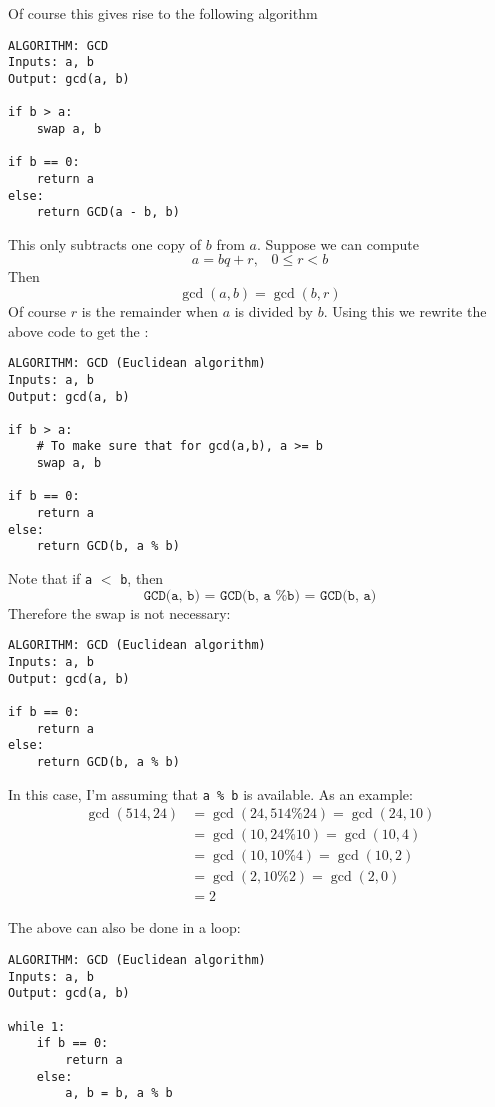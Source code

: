 Of course this gives rise to the following algorithm
\begin{Verbatim}[frame=single,fontsize=\footnotesize]
ALGORITHM: GCD
Inputs: a, b
Output: gcd(a, b)

if b > a:
    swap a, b

if b == 0:
    return a
else:
    return GCD(a - b, b) 
\end{Verbatim}

This only subtracts one copy of $b$ from $a$.
Suppose we can compute
\[
a = bq + r, \,\,\,\,\, 0 \leq r < b
\]
Then
\[
\gcd(a, b) = \gcd(b, r) 
\]
Of course $r$ is the remainder when $a$ is divided by $b$.
Using this we rewrite the above code to get
the
:
\begin{Verbatim}[frame=single,fontsize=\footnotesize]
ALGORITHM: GCD (Euclidean algorithm)
Inputs: a, b
Output: gcd(a, b)

if b > a:
    # To make sure that for gcd(a,b), a >= b
    swap a, b

if b == 0: 
    return a
else:
    return GCD(b, a % b)
\end{Verbatim}
Note that if \verb!a! $<$ \verb!b!, then
\[
\texttt{GCD(a, b) = GCD(b, a \% b) = GCD(b, a)}
\]
Therefore the swap is not necessary:
\begin{Verbatim}[frame=single,fontsize=\footnotesize]
ALGORITHM: GCD (Euclidean algorithm)
Inputs: a, b
Output: gcd(a, b)

if b == 0: 
    return a
else:
    return GCD(b, a % b)
\end{Verbatim}
In this case, I'm assuming that \verb!a % b! is available.
As an example:
\begin{align*}
  \gcd(514, 24)
  &= \gcd(24, 514 \% 24) = \gcd(24, 10) \\
  &= \gcd(10, 24 \% 10) = \gcd(10, 4) \\
  &= \gcd(10, 10 \% 4) = \gcd(10, 2) \\
  &= \gcd(2, 10 \% 2) = \gcd(2, 0) \\
  &= 2
\end{align*}

The above can also be done in a loop:
\begin{Verbatim}[frame=single,fontsize=\footnotesize]
ALGORITHM: GCD (Euclidean algorithm)
Inputs: a, b
Output: gcd(a, b)

while 1:
    if b == 0: 
        return a
    else:
        a, b = b, a % b
\end{Verbatim}

